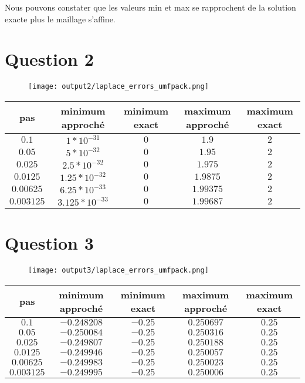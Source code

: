 \documentclass[11pt,a4paper]{report}
\begin{document}
		Nous pouvons constater que les valeurs min et max se rapprochent de la solution exacte plus le maillage s'affine.
		
		\section*{Question 2}
		
			\begin{figure}[H]
			\centering
			\texttt{[image: output2/laplace\_errors\_umfpack.png]}
		\end{figure}
	
	
	\begin{center}
		\begin{tabular}{|c|c|c|c|c|}
			\hline
			pas & minimum approché & minimum exact & maximum approché & maximum exact \\
			\hline 
			$0.1$ & $1*10^{-31}$ & $0$ & $1.9$ & $2$\\ 
			\hline 
			$0.05$ & $5*10^{-32}$ & $0$ & $1.95$ & $2$\\ 
			\hline 
			$0.025$ & $2.5*10^{-32}$ & $0$ & $1.975$ & $2$  \\ 
			\hline 
			$0.0125$ & $1.25*10^{-32}$ & $0$ & $1.9875$ & $2$\\ 
			\hline 
			$0.00625$ & $6.25*10^{-33}$ & $0$ & $1.99375$ & $2$ \\ 
			\hline 
			$0.003125$ & $3.125*10^{-33}$ & $0$ & $1.99687$ & $2$ \\ 
			\hline 
		\end{tabular} 
	\end{center}
	

		\section*{Question 3}
		
			\begin{figure}[H]
			\centering
			\texttt{[image: output3/laplace\_errors\_umfpack.png]}
			\end{figure}
		
		
		\begin{center}
			\begin{tabular}{|c|c|c|c|c|}
				\hline
				pas & minimum approché & minimum exact & maximum approché & maximum exact \\
				\hline 
				$0.1$ & $-0.248208$ & $-0.25$ & $0.250697$ & $0.25$\\ 
				\hline 
				$0.05$ & $-0.250084$ & $-0.25$ & $0.250316$ & $0.25$\\ 
				\hline 
				$0.025$ & $-0.249807$ & $-0.25$ & $0.250188$ & $0.25$  \\ 
				\hline 
				$0.0125$ & $-0.249946$ & $-0.25$ & $0.250057 $ & $0.25$\\ 
				\hline 
				$0.00625$ & $-0.249983$ & $-0.25$ & $0.250023$ & $0.25$ \\ 
				\hline 
				$0.003125$ & $-0.249995$ & $-0.25$ & $0.250006$ & $0.25$ \\ 
				\hline 
			\end{tabular} 
		\end{center}
\end{document}
